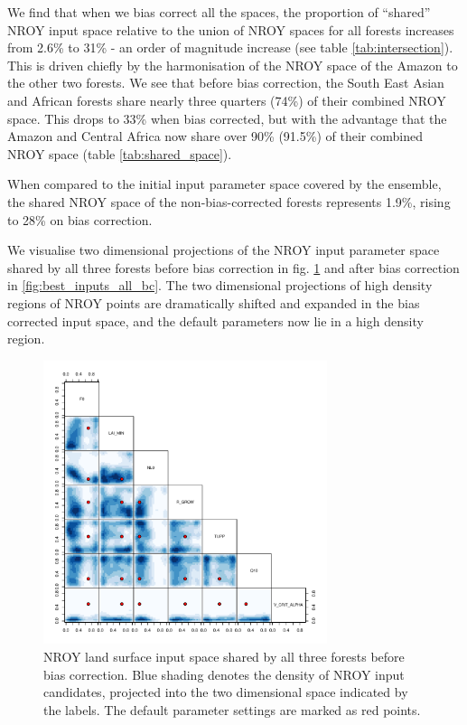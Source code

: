 \documentclass[gmd, manuscript]{copernicus}
\begin{document}
We find that when we bias correct all the spaces, the proportion of ``shared'' NROY input space relative to the union of NROY spaces for all forests increases from 2.6\% to 31\% - an order of magnitude increase (see table \ref{tab:intersection}). This is driven chiefly by the harmonisation of the NROY space of the Amazon to the other two forests. We see that before bias correction, the South East Asian and African forests share nearly three quarters (74\%) of their combined NROY space. This drops to 33\% when bias corrected, but with the advantage that the Amazon and Central Africa now share over 90\% (91.5\%) of their combined NROY space (table \ref{tab:shared_space}). 

When compared to the initial input parameter space covered by the ensemble, the shared NROY space of the non-bias-corrected forests represents 1.9\%, rising to 28\% on bias correction.

We visualise two dimensional projections of the NROY input parameter space shared by all three forests before bias correction in fig. \ref{fig:best_inputs_all_nobc} and after bias correction in \ref{fig:best_inputs_all_bc}. The two dimensional projections of high density regions of NROY points are dramatically shifted and expanded in the bias corrected input space, and the default parameters now lie in a high density region.

\begin{figure}[t]
\includegraphics[width=8.3cm]{../graphics/best_inputs_all_nobc.pdf}
\caption{NROY land surface input space shared by all three forests before bias correction. Blue shading denotes the density of NROY input candidates, projected into the two dimensional space indicated by the labels. The default parameter settings are marked as red points.
}
\label{fig:best_inputs_all_nobc}
\end{figure}
\end{document}
